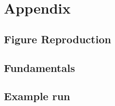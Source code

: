 \appendix
\part*{Appendix}
\chapter{Figure Reproduction}\label{apdx:figure_repoduction}


\chapter{Fundamentals}\label{apdx:fundamentals}


\chapter{Example  run}\label{apdx:software_eg}

